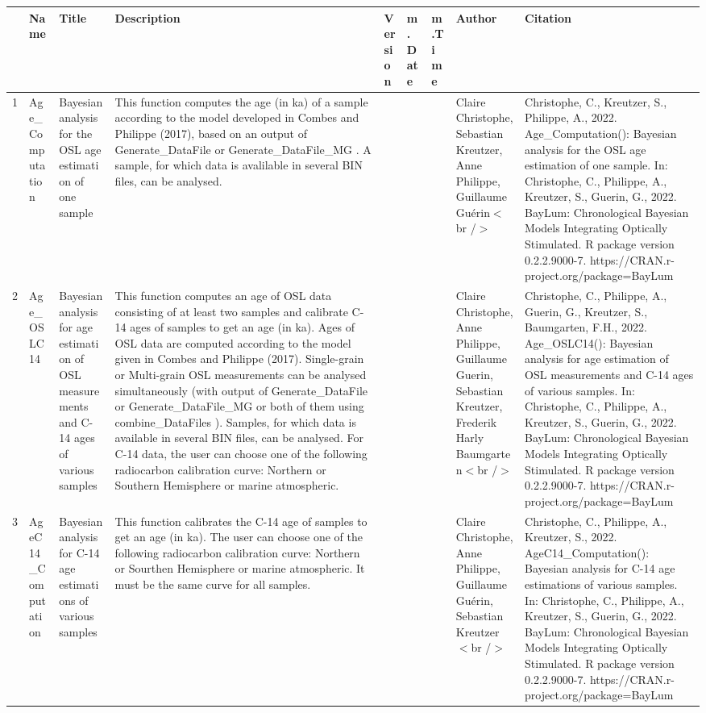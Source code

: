 \begin{table}[ht]
\centering
\begin{tabular}{rllllllll}
  \hline
 & Name & Title & Description & Version & m.Date & m.Time & Author & Citation \\ 
  \hline
1 & Age\_Computation & Bayesian analysis for the OSL age estimation of one sample & This function computes the age (in ka) of a sample according to the model developed in Combes and Philippe (2017), based on an output of  Generate\_DataFile  or  Generate\_DataFile\_MG .  A sample, for which data is avalilable in several BIN files, can be analysed. &  &  &  & Claire Christophe, Sebastian Kreutzer, Anne Philippe, Guillaume Guérin$<$br /$>$ & Christophe, C., Kreutzer, S., Philippe, A., 2022. Age\_Computation(): Bayesian analysis for the OSL age estimation of one sample. In: Christophe, C., Philippe, A., Kreutzer, S., Guerin, G., 2022. BayLum: Chronological Bayesian Models Integrating Optically Stimulated. R package version 0.2.2.9000-7. https://CRAN.r-project.org/package=BayLum
 \\ 
  2 & Age\_OSLC14 & Bayesian analysis for age estimation of OSL measurements and C-14 ages of various samples & This function computes an age of OSL data consisting of at least two samples and calibrate C-14 ages of samples to get an age (in ka).  Ages of OSL data are computed according to the model given in Combes and Philippe (2017). Single-grain or Multi-grain OSL measurements can be analysed simultaneously (with output of  Generate\_DataFile  or  Generate\_DataFile\_MG  or both of them using  combine\_DataFiles ). Samples, for which data is available in several BIN files, can be analysed.  For C-14 data, the user can choose one of the following radiocarbon calibration curve: Northern or Southern Hemisphere or marine atmospheric. &  &  &  & Claire Christophe, Anne Philippe, Guillaume Guerin, Sebastian Kreutzer, Frederik Harly Baumgarten$<$br /$>$ & Christophe, C., Philippe, A., Guerin, G., Kreutzer, S., Baumgarten, F.H., 2022. Age\_OSLC14(): Bayesian analysis for age estimation of OSL measurements and C-14 ages of various samples. In: Christophe, C., Philippe, A., Kreutzer, S., Guerin, G., 2022. BayLum: Chronological Bayesian Models Integrating Optically Stimulated. R package version 0.2.2.9000-7. https://CRAN.r-project.org/package=BayLum
 \\ 
  3 & AgeC14\_Computation & Bayesian analysis for C-14 age estimations of various samples & This function calibrates the C-14 age of samples to get an age (in ka). The user can choose one of the following radiocarbon calibration curve: Northern or Sourthen Hemisphere or marine atmospheric. It must be the same curve for all samples. &  &  &  & Claire Christophe, Anne Philippe, Guillaume Guérin, Sebastian Kreutzer$<$br /$>$ & Christophe, C., Philippe, A., Kreutzer, S., 2022. AgeC14\_Computation(): Bayesian analysis for C-14 age estimations of various samples. In: Christophe, C., Philippe, A., Kreutzer, S., Guerin, G., 2022. BayLum: Chronological Bayesian Models Integrating Optically Stimulated. R package version 0.2.2.9000-7. https://CRAN.r-project.org/package=BayLum

\end{tabular}
\end{table}
